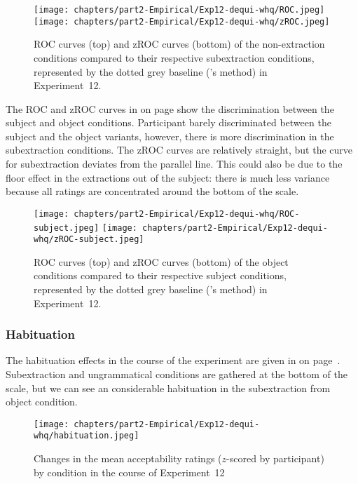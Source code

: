 \begin{figure}
    \centering
    \texttt{[image: chapters/part2-Empirical/Exp12-dequi-whq/ROC.jpeg]}
    \texttt{[image: chapters/part2-Empirical/Exp12-dequi-whq/zROC.jpeg]}
    \caption{ROC curves (top) and zROC curves (bottom) of the non-extraction conditions compared to their respective subextraction conditions, represented by the dotted grey baseline (\citealt{Dillon.2019}'s method) in Experiment~12.}
    \label{fig:exp12-ROC}
\end{figure}

The ROC and zROC curves in  on page \pageref{fig:exp12-ROC-subj} show the discrimination between the subject and object conditions. Participant barely discriminated between the subject and the object variants, however, there is more discrimination in the subextraction conditions. The zROC curves are relatively straight, but the curve for subextraction deviates from the parallel line. This could also be due to the floor effect in the extractions out of the subject: there is much less variance because all ratings are concentrated around the bottom of the scale. 

\begin{figure}
    \centering
    \texttt{[image: chapters/part2-Empirical/Exp12-dequi-whq/ROC-subject.jpeg]}
    \texttt{[image: chapters/part2-Empirical/Exp12-dequi-whq/zROC-subject.jpeg]}
    \caption{ROC curves (top) and zROC curves (bottom) of the object conditions compared to their respective subject conditions, represented by the dotted grey baseline (\citealt{Dillon.2019}'s method) in Experiment~12.}
    \label{fig:exp12-ROC-subj}
\end{figure}

\subsubsection{Habituation} 

The habituation effects in the course of the experiment are given in  on page~\pageref{fig:exp12-habituation}. Subextraction and ungrammatical conditions are gathered at the bottom of the scale, but we can see an considerable habituation in the subextraction from object condition. 

\begin{figure}
    \centering
    \texttt{[image: chapters/part2-Empirical/Exp12-dequi-whq/habituation.jpeg]}
    \caption{Changes in the mean acceptability ratings ($z$-scored by participant) by condition in the course of Experiment~12}
    \label{fig:exp12-habituation}
\end{figure}

